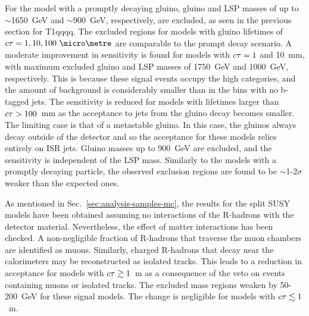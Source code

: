 For the model with a promptly decaying gluino, gluino and LSP masses of up to 
$\sim$1650~GeV and $\sim$900~GeV, respectively, are excluded, as seen in the 
previous section for T1qqqq. The excluded 
regions for models with gluino lifetimes of $\ctau = 1, 10, 100~\micro\metre$ 
are comparable to the prompt decay scenario. 
A moderate improvement in sensitivity is found for models with $c\tau = 1$ and 
10~mm, with maximum excluded gluino and LSP masses of 1750~GeV and 1000~GeV, 
respectively. This is because these signal events occupy the high \nb 
categories, and the amount of background is considerably smaller than in the 
bins with no b-tagged jets. 
The sensitivity is reduced for models with lifetimes larger than $c\tau > 
100$~mm as the acceptance to jets from the gluino decay becomes smaller. The 
limiting case is that of a metastable gluino. In this case, the gluinos always 
decay outside of the detector and so the acceptance for these models relies 
entirely on ISR jets. Gluino masses up to 900~GeV are excluded, and the 
sensitivity is independent of the LSP mass. 
Similarly to the models with a promptly decaying particle, the observed 
exclusion regions are found to be $\sim$1-2$\sigma$ weaker than the expected 
ones.

As mentioned in Sec.~\ref{sec:analysis-samples-mc}, the results for the split 
SUSY models have been obtained assuming no interactions of the R-hadrons with 
the detector material. Nevertheless, the effect of matter interactions has been 
checked. A 
non-negligible fraction of R-hadrons that traverse the muon chambers 
are identified as muons. Similarly, charged R-hadrons that decay near the 
calorimeters may be reconstructed as isolated tracks. This leads to a 
reduction in acceptance for models with $c\tau \gtrsim 1$~m as a consequence of 
the veto on events containing muons or isolated tracks.
The excluded mass regions weaken by 50-200~GeV for these signal models. The 
change is negligible for models with $c\tau \lesssim 1$~m.

